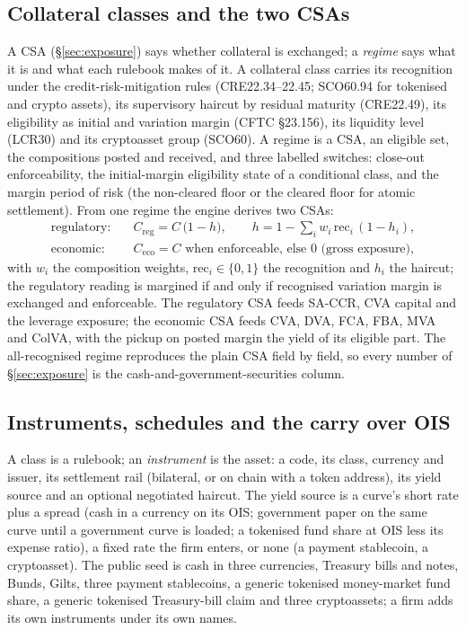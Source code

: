 \documentclass[11pt,a4paper]{article}
\let\plainsubsection\subsection
\renewcommand{\subsection}{\needspace{5\baselineskip}\plainsubsection}
\begin{document}
\subsection{Collateral classes and the two CSAs}
A CSA (\S\ref{sec:exposure}) says whether collateral is exchanged; a \emph{regime} says what it is and what each rulebook makes of it. A collateral class carries its recognition under the credit-risk-mitigation rules (CRE22.34--22.45; SCO60.94 for tokenised and crypto assets), its supervisory haircut by residual maturity (CRE22.49), its eligibility as initial and variation margin (CFTC \S23.156), its liquidity level (LCR30) and its cryptoasset group (SCO60). A regime is a CSA, an eligible set, the compositions posted and received, and three labelled switches: close-out enforceability, the initial-margin eligibility state of a conditional class, and the margin period of risk (the non-cleared floor or the cleared floor for atomic settlement). From one regime the engine derives two CSAs:
\begin{align}
\text{regulatory:}\quad & C_{\mathrm{reg}}=C\,\big(1-h\big),\qquad h=1-\textstyle\sum_i w_i\,\mathrm{rec}_i\,(1-h_i),\\
\text{economic:}\quad & C_{\mathrm{eco}}=C \text{ when enforceable, else } 0 \text{ (gross exposure)},
\end{align}
with $w_i$ the composition weights, $\mathrm{rec}_i\in\{0,1\}$ the recognition and $h_i$ the haircut; the regulatory reading is margined if and only if recognised variation margin is exchanged and enforceable. The regulatory CSA feeds SA-CCR, CVA capital and the leverage exposure; the economic CSA feeds CVA, DVA, FCA, FBA, MVA and ColVA, with the pickup on posted margin the yield of its eligible part. The all-recognised regime reproduces the plain CSA field by field, so every number of \S\ref{sec:exposure} is the cash-and-government-securities column.

\subsection{Instruments, schedules and the carry over OIS}
A class is a rulebook; an \emph{instrument} is the asset: a code, its class, currency and issuer, its settlement rail (bilateral, or on chain with a token address), its yield source and an optional negotiated haircut. The yield source is a curve's short rate plus a spread (cash in a currency on its OIS; government paper on the same curve until a government curve is loaded; a tokenised fund share at OIS less its expense ratio), a fixed rate the firm enters, or none (a payment stablecoin, a cryptoasset). The public seed is cash in three currencies, Treasury bills and notes, Bunds, Gilts, three payment stablecoins, a generic tokenised money-market fund share, a generic tokenised Treasury-bill claim and three cryptoassets; a firm adds its own instruments under its own names.
\end{document}
